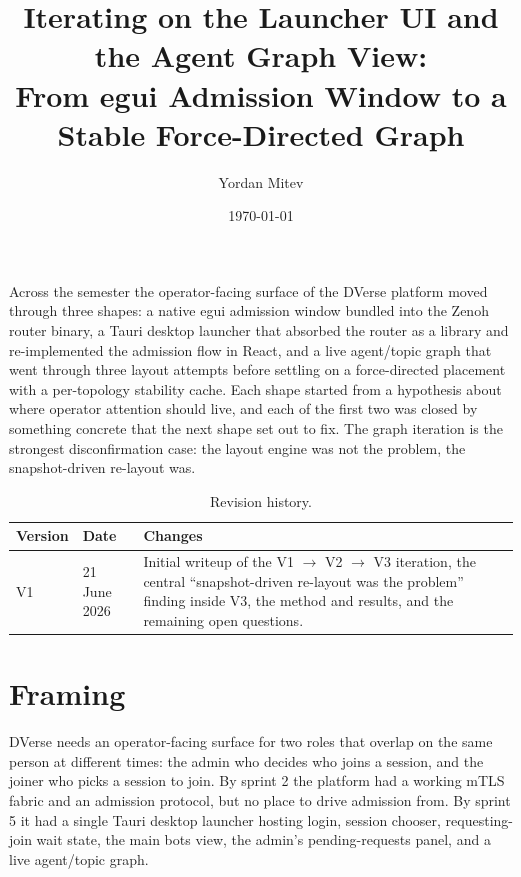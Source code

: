 \documentclass[11pt,a4paper]{article}
\title{%
  \vspace{-1cm}
  {\LARGE\bfseries Iterating on the Launcher UI and the Agent Graph View:\\
  From egui Admission Window to a Stable Force-Directed Graph}
}
\author{Yordan Mitev}
\date{\today}
\begin{document}
\maketitle
\thispagestyle{fancy}

\begin{abstractbox}
  Across the semester the operator-facing surface of the DVerse
  platform moved through three shapes: a native egui admission
  window bundled into the Zenoh router binary, a Tauri desktop
  launcher that absorbed the router as a library and re-implemented
  the admission flow in React, and a live agent/topic graph that
  went through three layout attempts before settling on a
  force-directed placement with a per-topology stability cache.
  Each shape started from a hypothesis about where operator
  attention should live, and each of the first two was closed by
  something concrete that the next shape set out to fix. The graph
  iteration is the strongest disconfirmation case: the layout
  engine was not the problem, the snapshot-driven re-layout was.
\end{abstractbox}

\vspace{1em}

\begin{table}[H]
  \centering
  \small
  \begin{tabular}{|l|l|p{8cm}|}
    \hline
    \rowcolor{gray!15}
    \textbf{Version} & \textbf{Date} & \textbf{Changes} \\
    \hline
    V1 & 21 June 2026 & Initial writeup of the V1 \(\rightarrow\)
    V2 \(\rightarrow\) V3 iteration, the central
    ``snapshot-driven re-layout was the problem'' finding inside
    V3, the method and results, and the remaining open questions. \\
    \hline
  \end{tabular}
  \caption{Revision history.}
  \label{tab:ui-iter-history}
\end{table}

\newpage
\tableofcontents
\newpage

\section{Framing}

DVerse needs an operator-facing surface for two roles that overlap
on the same person at different times: the admin who decides who
joins a session, and the joiner who picks a session to join. By
sprint 2 the platform had a working mTLS fabric and an admission
protocol, but no place to drive admission from. By sprint 5 it
had a single Tauri desktop launcher hosting login, session
chooser, requesting-join wait state, the main bots view, the
admin's pending-requests panel, and a live agent/topic graph.
\end{document}
